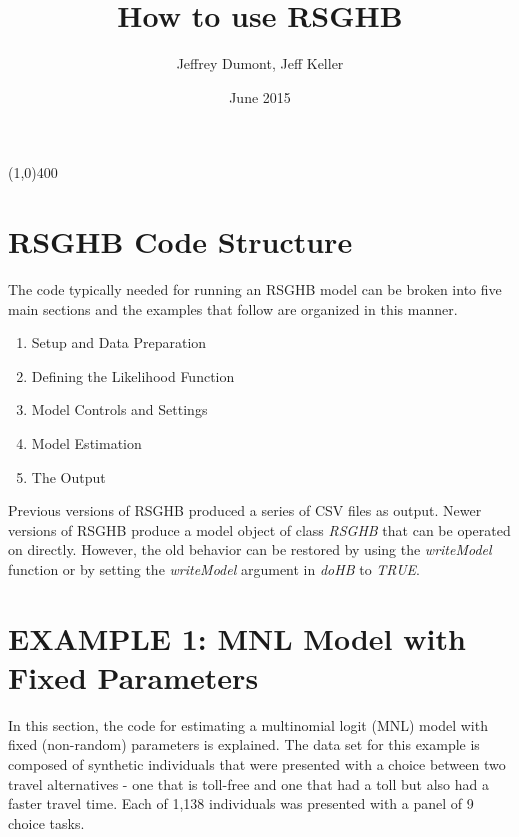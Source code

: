 \documentclass{article}\usepackage[]{graphicx}\usepackage[]{color}
\begin{document}
\title{How to use RSGHB}
\author{Jeffrey Dumont, Jeff Keller}
\date{June 2015}
\maketitle
{}

\begin{center}
\line(1,0){400}
\end{center}

\section*{RSGHB Code Structure}

The code typically needed for running an RSGHB model can be broken into five main sections and the examples that follow are organized in this manner.

\begin{enumerate}
     \item Setup and Data Preparation
     \item Defining the Likelihood Function
     \item Model Controls and Settings
     \item Model Estimation
     \item The Output
\end{enumerate}

Previous versions of RSGHB produced a series of CSV files as output. Newer versions of RSGHB produce a model object of class \emph{RSGHB} that can be operated on directly. However, the old behavior can be restored by using the \emph{writeModel} function or by setting the \emph{writeModel} argument in \emph{doHB} to \emph{TRUE}.

\section*{EXAMPLE 1: MNL Model with Fixed Parameters}

In this section, the code for estimating a multinomial logit (MNL) model with fixed (non-random) parameters is explained. The data set for this example is composed of synthetic individuals that were presented with a choice between two travel alternatives - one that is toll-free and one that had a toll but also had a faster travel time. Each of 1,138 individuals was presented with a panel of 9 choice tasks.
\end{document}
